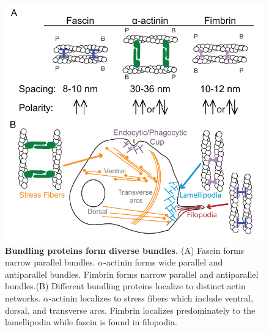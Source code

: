 \begin{figure}
\centering
\includegraphics[width=14cm]{img/ch01/bundlers_thesis.pdf}
\caption[Bundling proteins form diverse bundles.]{\textbf{Bundling proteins form diverse bundles.} (A) Fascin forms narrow parallel bundles. $\alpha$-actinin forms wide parallel and antiparallel bundles. Fimbrin forms narrow parallel and antiparallel bundles.(B) Different bundling proteins localize to distinct actin networks. $\alpha$-actinin localizes to stress fibers which include ventral, dorsal, and transverse arcs. Fimbrin localizes predominately to the lamellipodia while fascin is found in filopodia.}
\label{fig:intro-bundlers}
\end{figure}

